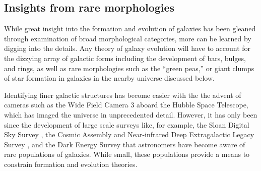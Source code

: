 


\subsection{Insights from rare morphologies}

While great insight into the formation and evolution of galaxies has been gleaned through examination of broad morphological categories, more can be learned by digging into the details. Any theory of galaxy evolution will have to account for the dizzying array of galactic forms including the development of bars, bulges, and rings, as well as rare morphologies such as the ``green peas,'' or giant clumps of star formation in galaxies in the nearby universe discussed below.

Identifying finer galactic structures has become easier with the the advent of cameras such as the Wide Field Camera 3 \citep{Dressel2012} aboard the Hubble Space Telescope, which has imaged the universe in unprecedented detail. However, it has only been since the development of large scale surveys like, for example, the Sloan Digital Sky Survey \citep[SDSS,][]{York2000,Abazajian2003}, the Cosmic Assembly and Near-infrared Deep Extragalactic Legacy Survey \citep[CANDELS,][]{Grogin2011,Koekemoer2011}, and the Dark Energy Survey \citep[DES,][]{DES2005} that astronomers have become aware of rare populations of galaxies. While small, these populations provide a means to constrain formation and evolution theories. 


